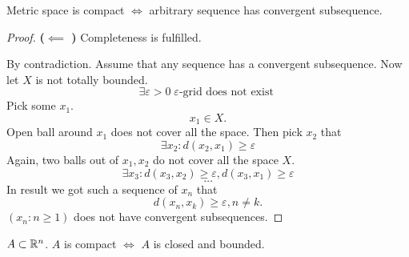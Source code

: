 \begin{corollary}
  Metric space is compact $\iff$ arbitrary sequence has convergent subsequence.
\end{corollary}

\begin{proof}
  \textbf{($\impliedby$ )} Completeness is fulfilled.
  
  By contradiction. Assume that any sequence has a convergent subsequence. Now let $X$ is not totally bounded.
  \[ \exists \varepsilon>0 \; \varepsilon\text{-grid does not exist } \] 
  Pick some $x_1$.
  \[ x_1 \in  X . \] 
 Open ball around $x_1$ does not cover all the space.
 Then pick $x_2$ that
 \[ \exists x_2: d(x_2, x_1) \ge  \varepsilon \] 
 Again, two balls out of $x_1, x_2$ do not cover all the space $X$.
  \[ \exists x_3: d(x_3, x_2) \ge  \varepsilon, d(x_3, x_1) \ge  \varepsilon \] 
  \[ \ldots \] 
  In result we got such a sequence of $x_n$ that
  \[ d(x_n, x_k) \ge  \varepsilon, n \neq k. \] 
  $(x_n: n \ge 1)$ does not have convergent subsequences.
\end{proof}


\begin{example}
  $A \subset \mathbb{R}^{n}$. $A$ is compact $\iff$ $A$ is closed and bounded.
\end{example}

